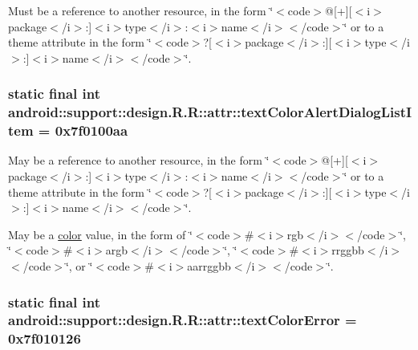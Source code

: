Must be a reference to another resource, in the form \char`\"{}$<$code$>$@\mbox{[}+\mbox{]}\mbox{[}$<$i$>$package$<$/i$>$:\mbox{]}$<$i$>$type$<$/i$>$:$<$i$>$name$<$/i$>$$<$/code$>$\char`\"{} or to a theme attribute in the form \char`\"{}$<$code$>$?\mbox{[}$<$i$>$package$<$/i$>$:\mbox{]}\mbox{[}$<$i$>$type$<$/i$>$:\mbox{]}$<$i$>$name$<$/i$>$$<$/code$>$\char`\"{}. \hypertarget{classandroid_1_1support_1_1design_1_1_r_1_1attr_0f6e79809a6b2fb4f4c54ab1f76c3796}{
\subsubsection[{textColorAlertDialogListItem}]{\setlength{\rightskip}{0pt plus 5cm}static final int android::support::design.R.R::attr::textColorAlertDialogListItem = 0x7f0100aa}}
\label{classandroid_1_1support_1_1design_1_1_r_1_1attr_0f6e79809a6b2fb4f4c54ab1f76c3796}


May be a reference to another resource, in the form \char`\"{}$<$code$>$@\mbox{[}+\mbox{]}\mbox{[}$<$i$>$package$<$/i$>$:\mbox{]}$<$i$>$type$<$/i$>$:$<$i$>$name$<$/i$>$$<$/code$>$\char`\"{} or to a theme attribute in the form \char`\"{}$<$code$>$?\mbox{[}$<$i$>$package$<$/i$>$:\mbox{]}\mbox{[}$<$i$>$type$<$/i$>$:\mbox{]}$<$i$>$name$<$/i$>$$<$/code$>$\char`\"{}. 

May be a \hyperlink{classandroid_1_1support_1_1design_1_1_r_1_1color}{color} value, in the form of \char`\"{}$<$code$>$\#$<$i$>$rgb$<$/i$>$$<$/code$>$\char`\"{}, \char`\"{}$<$code$>$\#$<$i$>$argb$<$/i$>$$<$/code$>$\char`\"{}, \char`\"{}$<$code$>$\#$<$i$>$rrggbb$<$/i$>$$<$/code$>$\char`\"{}, or \char`\"{}$<$code$>$\#$<$i$>$aarrggbb$<$/i$>$$<$/code$>$\char`\"{}. \hypertarget{classandroid_1_1support_1_1design_1_1_r_1_1attr_0ede82b9d2331ab1d55a99317d27ed66}{
\subsubsection[{textColorError}]{\setlength{\rightskip}{0pt plus 5cm}static final int android::support::design.R.R::attr::textColorError = 0x7f010126}}
\label{classandroid_1_1support_1_1design_1_1_r_1_1attr_0ede82b9d2331ab1d55a99317d27ed66}


